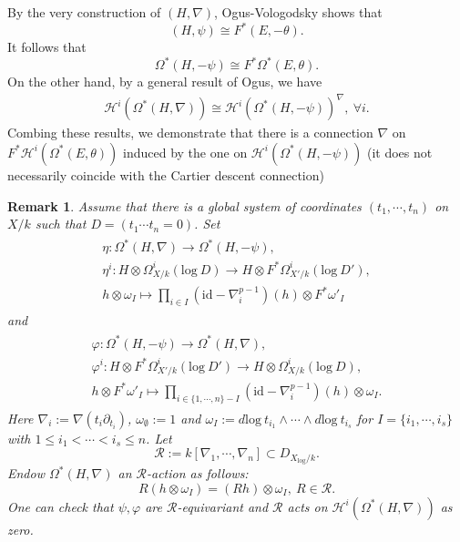 \documentclass[12pt, a4paper]{article}
\newtheorem{remark}{Remark}[section]
\begin{document}
By the very construction of $(H,\nabla)$, Ogus-Vologodsky\cite[Theorem 2.13]{OV} shows that 
$$
(H,\psi)\cong F^*(E,-\theta).
$$
It follows that
$$
\Omega^*(H,-\psi)\cong F^*\Omega^*(E,\theta).
$$
On the other hand, by a general result of Ogus\cite[Theorem 1.2.1]{Ogus04}, we have 
\begin{eqnarray}\label{Ogus iso}
\mathcal H^i(\Omega^*(H,\nabla))\cong\mathcal H^i(\Omega^*(H,-\psi))^\nabla,~\forall i.
\end{eqnarray}
Combing these results, we demonstrate that there is a connection $\nabla$ on $F^*\mathcal H^i(\Omega^*(E,\theta))$ induced by the one on $\mathcal H^i(\Omega^*(H,-\psi))$ (it does not necessarily coincide with the Cartier descent connection)





\begin{remark}\label{explicit construction}
Assume that there is a global system of coordinates $(t_1,\cdots,t_n)$ on $X/k$ such that $D=(t_1\cdots t_n=0)$. Set
\begin{eqnarray}\label{de Rham F-Higgs}
\begin{array}{c}
\eta:\Omega^*(H,\nabla)\to\Omega^*(H,-\psi),\\
\eta^i: H\otimes\Omega_{X/k}^i(\mathrm{log}~D)\to H\otimes F^*\Omega_{X'/k}^i(\mathrm{log}~D'),\\
h\otimes\omega_I\mapsto\prod_{i\in I}(\mathrm{id}-\nabla_i^{p-1})(h)\otimes F^*\omega'_I
\end{array}
\end{eqnarray}
and
\begin{eqnarray}\label{F-Higgs de Rham}
\begin{array}{c}
\varphi: \Omega^*(H,-\psi)\to\Omega^*(H,\nabla),\\
\varphi^i: H\otimes F^*\Omega_{X'/k}^i(\mathrm{log}~D')\to H\otimes\Omega_{X/k}^i(\mathrm{log}~D),\\
h\otimes F^*\omega'_I\mapsto\prod_{i\in\{1,\cdots,n\}-I}(\mathrm{id}-\nabla_i^{p-1})(h)\otimes\omega_I.
\end{array}
\end{eqnarray}
Here $\nabla_i:=\nabla(t_i\partial_{t_i})$, $\omega_\emptyset:=1$ and $\omega_I:=d\mathrm{log}~t_{i_1}\wedge\cdots\wedge d\mathrm{log}~t_{i_s}$ for $I=\{i_1,\cdots,i_s\}$ with $1\leq i_1<\cdots<i_s\leq n$. Let 
$$\mathcal R:=k[\nabla_1,\cdots,\nabla_n]\subset D_{X_{\log}/k}.$$ 
Endow $\Omega^*(H,\nabla)$ an $\mathcal R$-action as follows:
$$
R(h\otimes\omega_I)=(Rh)\otimes\omega_I,~R\in\mathcal R.
$$
One can check that $\psi,\varphi$ are $\mathcal R$-equivariant and $\mathcal R$ acts on $\mathcal H^i(\Omega^*(H,\nabla))$ as zero.


\end{remark}
\end{document}
